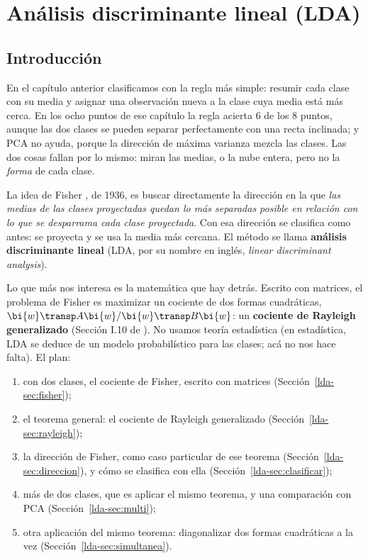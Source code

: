 \chapter{Análisis discriminante lineal (LDA)}\label{cap:lda}\label{lda-cap}

\section{Introducción}\label{lda-sec:intro}

En el capítulo anterior clasificamos con la regla más simple: resumir cada
clase con su media y asignar una observación nueva a la clase cuya media está
más cerca. En los ocho puntos de ese capítulo la regla acierta $6$ de los $8$
puntos, aunque las dos clases se pueden separar perfectamente con una recta
inclinada; y PCA no ayuda, porque la dirección de máxima varianza mezcla las
clases. Las dos cosas fallan por lo mismo: miran las medias, o la nube entera,
pero no la \emph{forma} de cada clase.

La idea de Fisher \cite{Fisher1936}, de 1936, es buscar directamente la
dirección en la que \emph{las medias de las clases proyectadas quedan lo más
separadas posible en relación con lo que se desparrama cada clase
proyectada}. Con esa dirección se clasifica como antes: se proyecta y se usa
la media más cercana. El método se llama \textbf{análisis discriminante
lineal} (LDA, por su nombre en inglés, \emph{linear discriminant analysis}).

Lo que más nos interesa es la matemática que hay detrás. Escrito con
matrices, el problema de Fisher es maximizar un cociente de dos formas
cuadráticas, $\bi{w}\transp A\bi{w}/\bi{w}\transp B\bi{w}$: un \textbf{cociente de Rayleigh
generalizado} (Sección I.10 de \cite{Strang2019}). No usamos teoría
estadística (en estadística, LDA se deduce de un modelo probabilístico para
las clases; acá no nos hace falta). El plan:
\begin{enumerate}[leftmargin=*,itemsep=1pt]
\item con dos clases, el cociente de Fisher, escrito con matrices
(Sección~\ref{lda-sec:fisher});
\item el teorema general: el cociente de Rayleigh generalizado
(Sección~\ref{lda-sec:rayleigh});
\item la dirección de Fisher, como caso particular de ese teorema
(Sección~\ref{lda-sec:direccion}), y cómo se clasifica con ella
(Sección~\ref{lda-sec:clasificar});
\item más de dos clases, que es aplicar el mismo teorema, y una comparación
con PCA (Sección~\ref{lda-sec:multi});
\item otra aplicación del mismo teorema: diagonalizar dos formas cuadráticas
a la vez (Sección~\ref{lda-sec:simultanea}).
\end{enumerate}

